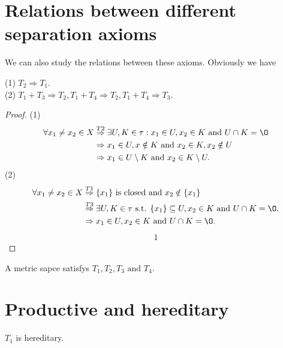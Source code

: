 \section{Relations between different separation axioms}


We can also study the relations between these axioms. Obviously we have
\begin{proposition}{}{}
    (1) $T_2\Rightarrow T_1$.\\
    (2) $T_1+T_3\Rightarrow T_2, T_1+T_4\Rightarrow T_2, T_1+T_4\Rightarrow T_3$.\\
\end{proposition}

\begin{proof}
    (1) \begin{align*}
    \forall x_1\neq x_2\in X &\overset{T2}{\Rightarrow} \exists U,K\in \tau: x_1\in U,x_2\in K \text{ and } U\cap K=\O\\
                            & \Rightarrow x_1\in U, x\notin K \text{ and } x_2\in K, x_2\notin U\\
                            & \Rightarrow x_1\in U\setminus K \text{ and } x_2\in K\setminus U.
        \end{align*}
    (2) 
    \begin{align*}
        \forall x_1\neq x_2\in X &\overset{T1}{\Rightarrow} \{x_1\} \text{ is closed and } x_2\notin \{x_1\}\\
                                & \overset{T3}{\Rightarrow} \exists U,K\in \tau \text{ s.t. } \{x_1\}\subseteq U, x_2\in K \text{ and } U\cap K=\O.\\
                                & \Rightarrow x_1\in U,x_2\in K \text{ and } U\cap K=\O.
    \end{align*}
    \begin{align*}
        1
    \end{align*}
\end{proof}

\begin{proposition}{}{}
    A metric sapce satisfys $T_1,T_2,T_3 \text{ and } T_4$.
\end{proposition}

\section{Productive and hereditary}

\begin{proposition}{}{}
    $T_1$ is hereditary. 
\end{proposition}

